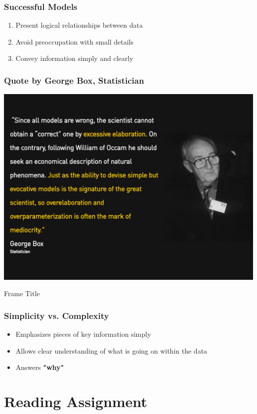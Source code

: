 \documentclass[12pt, block=fill]{beamer}
\begin{document}
\begin{frame}
  \frametitle{Successful Models}
  \begin{enumerate}
      \item Present logical relationships between data
      \item Avoid preoccupation with small details
      \item Convey information simply and clearly
  \end{enumerate}
\end{frame}

\begin{frame}
  \frametitle{Quote by George Box, Statistician}
  \begin{center}
    \includegraphics[width=0.9\linewidth]{figures/george_box_quote_b.png}     
  \end{center}
\end{frame}


\begin{frame}{Frame Title}
  \frametitle{Simplicity vs. Complexity}

\begin{itemize}
    \item Emphasizes pieces of key information simply
    \item Allows clear understanding of what is going on within the data
    \item Answers \textbf{"why"}
\end{itemize}   
\end{frame}



\section{Reading Assignment}
\end{document}
